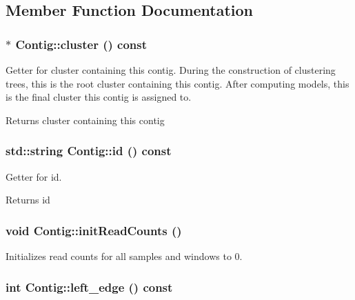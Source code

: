 \subsection{Member Function Documentation}
\hypertarget{classContig_aff0179a2d1010e85316f6f842fe01ae2}{
\subsubsection[{cluster}]{ $\ast$ Contig::cluster () const}}
\label{classContig_aff0179a2d1010e85316f6f842fe01ae2}


Getter for cluster containing this contig. During the construction of clustering trees, this is the root cluster containing this contig. After computing models, this is the final cluster this contig is assigned to.

\begin{DoxyReturn}{Returns}
cluster containing this contig 
\end{DoxyReturn}
\hypertarget{classContig_a01b2b4e2acbc8157c4a2e17e837a5805}{
\subsubsection[{id}]{\setlength{\rightskip}{0pt plus 5cm}std::string Contig::id () const}}
\label{classContig_a01b2b4e2acbc8157c4a2e17e837a5805}


Getter for id. \begin{DoxyReturn}{Returns}
id 
\end{DoxyReturn}
\hypertarget{classContig_ab1d6cdbcc3b964b8a671a214180e163f}{
\subsubsection[{initReadCounts}]{\setlength{\rightskip}{0pt plus 5cm}void Contig::initReadCounts ()}}
\label{classContig_ab1d6cdbcc3b964b8a671a214180e163f}


Initializes read counts for all samples and windows to 0. \hypertarget{classContig_a6ce973add14cd9ad93d3911dbd2cd6e9}{
\subsubsection[{left\_\-edge}]{\setlength{\rightskip}{0pt plus 5cm}int Contig::left\_\-edge () const}}
\label{classContig_a6ce973add14cd9ad93d3911dbd2cd6e9}


